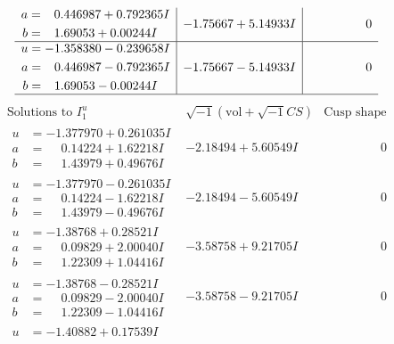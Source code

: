 \documentclass[1p]{elsarticle_modified}
\theoremstyle{definition}
\newcommand{\I}{\sqrt{-1}}
\begin{document}
$$\begin{array}{c|c|c}
\begin{aligned}
a &= \phantom{-}0.446987 + 0.792365 I \\
b &= \phantom{-}1.69053 + 0.00244 I\end{aligned}
 & -1.75667 + 5.14933 I & \phantom{-0.000000 } 0 \\ \hline\begin{aligned}
u &= -1.358380 - 0.239658 I \\
a &= \phantom{-}0.446987 - 0.792365 I \\
b &= \phantom{-}1.69053 - 0.00244 I\end{aligned}
 & -1.75667 - 5.14933 I & \phantom{-0.000000 } 0\\
 \hline 
 \end{array}$$\newpage$$\begin{array}{c|c|c}  
\text{Solutions to }I^u_{1}& \I (\text{vol} + \sqrt{-1}CS) & \text{Cusp shape}\\
 \hline 
\begin{aligned}
u &= -1.377970 + 0.261035 I \\
a &= \phantom{-}0.14224 + 1.62218 I \\
b &= \phantom{-}1.43979 + 0.49676 I\end{aligned}
 & -2.18494 + 5.60549 I & \phantom{-0.000000 } 0 \\ \hline\begin{aligned}
u &= -1.377970 - 0.261035 I \\
a &= \phantom{-}0.14224 - 1.62218 I \\
b &= \phantom{-}1.43979 - 0.49676 I\end{aligned}
 & -2.18494 - 5.60549 I & \phantom{-0.000000 } 0 \\ \hline\begin{aligned}
u &= -1.38768 + 0.28521 I \\
a &= \phantom{-}0.09829 + 2.00040 I \\
b &= \phantom{-}1.22309 + 1.04416 I\end{aligned}
 & -3.58758 + 9.21705 I & \phantom{-0.000000 } 0 \\ \hline\begin{aligned}
u &= -1.38768 - 0.28521 I \\
a &= \phantom{-}0.09829 - 2.00040 I \\
b &= \phantom{-}1.22309 - 1.04416 I\end{aligned}
 & -3.58758 - 9.21705 I & \phantom{-0.000000 } 0 \\ \hline\begin{aligned}
u &= -1.40882 + 0.17539 I \\

\end{aligned}
\end{array}$$
\end{document}
